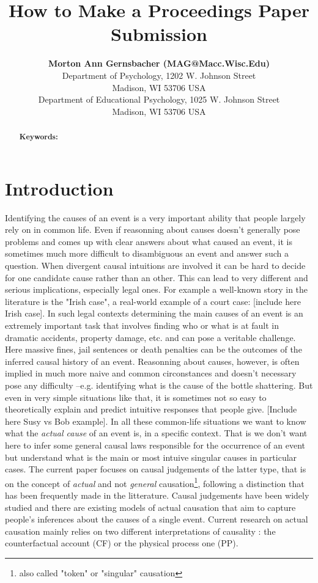 \documentclass[10pt,letterpaper]{article}
\title{How to Make a Proceedings Paper Submission}
\author{{\large \bf Morton Ann Gernsbacher (MAG@Macc.Wisc.Edu)} \\
  Department of Psychology, 1202 W. Johnson Street \\
  Madison, WI 53706 USA
  \AND {\large \bf Sharon J.~Derry (SDJ@Macc.Wisc.Edu)} \\
  Department of Educational Psychology, 1025 W. Johnson Street \\
  Madison, WI 53706 USA}
\begin{document}
\maketitle


\begin{abstract}

\textbf{Keywords:} 
\end{abstract}


\section{Introduction}

Identifying the causes of an event is a very important ability that people largely rely on in common life. Even if reasonning about causes doesn't generally pose problems and comes up with clear answers about what caused an event, it is sometimes much more difficult to disambiguous an event and answer such a question. When divergent causal intuitions are involved it can be hard to decide for one candidate cause rather than an other. This can lead to very different and serious implications, especially legal ones. For example a well-known story in the literature is the "Irish case", a real-world example of a court case: [include here Irish case]. In such legal contexts determining the main causes of an event is an extremely important task that involves finding who or what is at fault in dramatic accidents, property damage, etc. and can pose a veritable challenge. Here massive fines, jail sentences or death penalties can be the outcomes of the inferred causal history of an event. Reasonning about causes, however, is often implied in much more naive and common circonstances and doesn't necessary pose any difficulty --e.g. identifying what is the cause of the bottle shattering. But even in very simple situations like that, it is sometimes not so easy to theoretically explain and predict intuitive responses that people give. [Include here Susy vs Bob example]. In all these common-life situations we want to know what the \textit{actual cause} of an event is, in a specific context. That is we don't want here to infer some general causal laws responsible for the occurrence of an event but understand what is the main or most intuive singular causes in particular cases. The current paper focuses on causal judgements of the latter type, that is on the concept of \textit{actual} and not \textit{general} causation\footnote{also called "token" or "singular" causation}, following a distinction that has been frequently made in the litterature. Causal judgements have been widely studied and there are existing models of actual causation that aim to capture people's inferences about the causes of a single event. Current research on actual causation mainly relies on two different interpretations of causality : the counterfactual account (CF) or the physical process one (PP).
\end{document}
